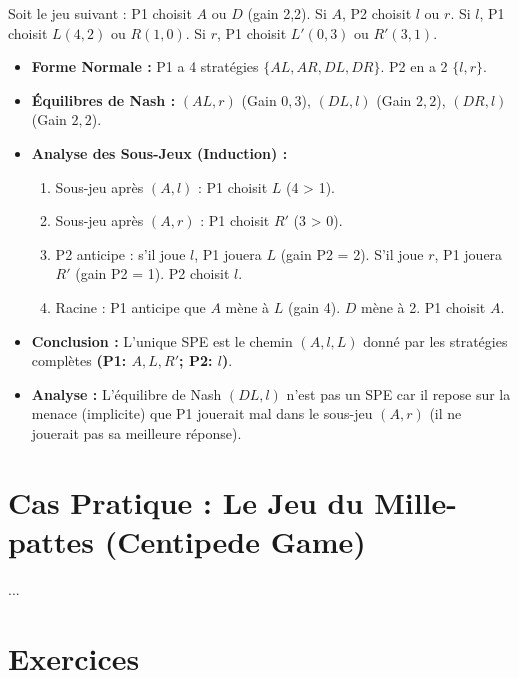 \begin{exemple}
Soit le jeu suivant : P1 choisit $A$ ou $D$ (gain 2,2). Si $A$, P2 choisit $l$ ou $r$. Si $l$, P1 choisit $L(4,2)$ ou $R(1,0)$. Si $r$, P1 choisit $L'(0,3)$ ou $R'(3,1)$.
\begin{itemize}
    \item \textbf{Forme Normale :} P1 a 4 stratégies $\{AL, AR, DL, DR\}$. P2 en a 2 $\{l, r\}$.
    \item \textbf{Équilibres de Nash :} $(AL, r)$ (Gain $0,3$), $(DL, l)$ (Gain $2,2$), $(DR, l)$ (Gain $2,2$).
    \item \textbf{Analyse des Sous-Jeux (Induction) :}
    \begin{enumerate}
        \item Sous-jeu après $(A,l)$ : P1 choisit $L$ (4 > 1).
        \item Sous-jeu après $(A,r)$ : P1 choisit $R'$ (3 > 0).
        \item P2 anticipe : s'il joue $l$, P1 jouera $L$ (gain P2 = 2). S'il joue $r$, P1 jouera $R'$ (gain P2 = 1). P2 choisit $l$.
        \item Racine : P1 anticipe que $A$ mène à $L$ (gain 4). $D$ mène à 2. P1 choisit $A$.
    \end{enumerate}
    \item \textbf{Conclusion :} L'unique SPE est le chemin $(A, l, L)$ donné par les stratégies complètes \textbf{(P1: $A, L, R'$; P2: $l$)}.
    \item \textbf{Analyse :} L'équilibre de Nash $(DL, l)$ n'est pas un SPE car il repose sur la menace (implicite) que P1 jouerait mal dans le sous-jeu $(A,r)$ (il ne jouerait pas sa meilleure réponse).
\end{itemize}
\end{exemple}

\section{Cas Pratique : Le Jeu du Mille-pattes (Centipede Game)}
...

\section{Exercices}
